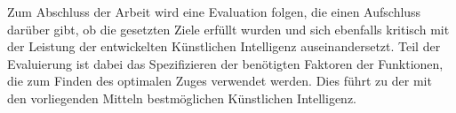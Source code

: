 Zum Abschluss der Arbeit wird eine Evaluation folgen, die einen Aufschluss darüber gibt, ob die gesetzten Ziele erfüllt wurden und sich ebenfalls kritisch mit der Leistung der entwickelten Künstlichen Intelligenz auseinandersetzt. Teil der Evaluierung ist dabei das Spezifizieren der benötigten Faktoren der Funktionen, die zum Finden des optimalen Zuges verwendet werden. Dies führt zu der mit den vorliegenden Mitteln bestmöglichen Künstlichen Intelligenz.






